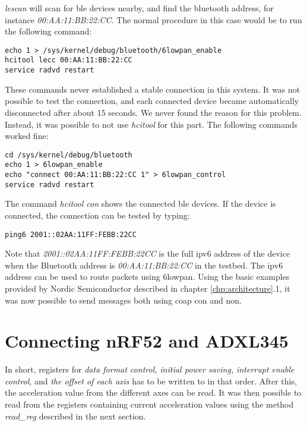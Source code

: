 \noindent \textit{lescan} will scan for \gls{ble} devices nearby, and find the bluetooth address, for instance \textit{00:AA:11:BB:22:CC}. The normal procedure in this case would be to run the following command: 

\begin{verbatim}
echo 1 > /sys/kernel/debug/bluetooth/6lowpan_enable
hcitool lecc 00:AA:11:BB:22:CC
service radvd restart
\end{verbatim}

\noindent These commands never established a stable connection in this system. It was not possible to test the connection, and each connected device became automatically disconnected after about 15 seconds. We never found the reason for this problem. Instead, it was possible to not use \textit{hcitool} for this part. The following commands worked fine:

\begin{verbatim}
cd /sys/kernel/debug/bluetooth
echo 1 > 6lowpan_enable
echo "connect 00:AA:11:BB:22:CC 1" > 6lowpan_control
service radvd restart
\end{verbatim} 

\noindent The command \textit{hcitool con} shows the connected \gls{ble} devices. If the device is connected, the connection can be tested by typing:

\begin{verbatim}
ping6 2001::02AA:11FF:FEBB:22CC
\end{verbatim}


\noindent Note that \textit{2001::02AA:11FF:FEBB:22CC} is the full \gls{ipv6} address of the device when the Bluetooth address is \textit{00:AA:11:BB:22:CC} in the testbed. The \gls{ipv6} address can be used to route packets using \gls{6lowpan}. Using the basic examples provided by Nordic Semiconductor described in chapter \ref{chp:architecture}.1, it was now possible to send messages both using \gls{coap} \gls{con} and \gls{non}.


\section{Connecting nRF52 and ADXL345}

In short, registers for \textit{data format control, initial power saving, interrupt enable control}, and \textit{the offset of each axis} has to be written to in that order. After this, the acceleration value from the different axes can be read. It was then possible to read from the registers containing current acceleration values using the method \textit{read\_reg} described in the next section.  

